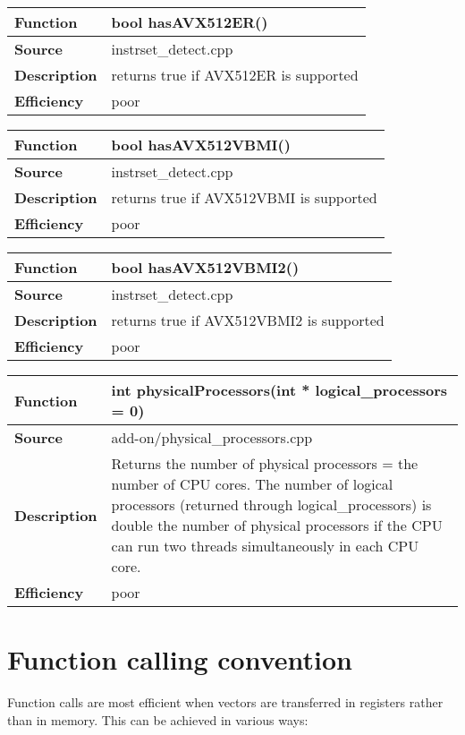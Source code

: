 \documentclass[vcl_manual.tex]{subfiles}
\begin{document}
\begin{tabular}{|p{25mm}|p{100mm}|}
\hline
\bfseries Function & bool hasAVX512ER() \\ \hline
\bfseries Source & instrset\_detect.cpp \\ \hline
\bfseries Description & returns true if AVX512ER is supported \\ \hline
 \bfseries Efficiency & poor \\ \hline
\end{tabular}

\begin{tabular}{|p{25mm}|p{100mm}|}
\hline
\bfseries Function & bool hasAVX512VBMI() \\ \hline
\bfseries Source & instrset\_detect.cpp \\ \hline
\bfseries Description & returns true if AVX512VBMI is supported \\ \hline
 \bfseries Efficiency & poor \\ \hline
\end{tabular}

\begin{tabular}{|p{25mm}|p{100mm}|}
\hline
\bfseries Function & bool hasAVX512VBMI2() \\ \hline
\bfseries Source & instrset\_detect.cpp \\ \hline
\bfseries Description & returns true if AVX512VBMI2 is supported \\ \hline
 \bfseries Efficiency & poor \\ \hline
\end{tabular}

\label{physicalProcessors}
\begin{tabular}{|p{25mm}|p{100mm}|}
\hline
\bfseries Function & int physicalProcessors(int * logical\_processors = 0) \\ \hline
\bfseries Source & add-on/physical\_processors.cpp \\ \hline
\bfseries Description & Returns the number of physical processors = the number of 
CPU cores. The number of logical processors (returned through 
logical\_processors) is double the number of physical processors if the CPU can run two threads simultaneously in each CPU core. \\ \hline
 \bfseries Efficiency & poor \\ \hline
\end{tabular}


\section{Function calling convention}\label{FunctionCallingConvention}
Function calls are most efficient when vectors are transferred in registers rather than in memory. This can be achieved in various ways:
\end{document}
